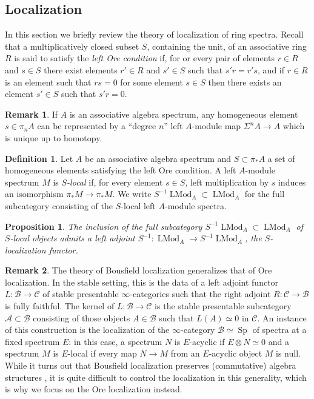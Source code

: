 \documentclass[12pt]{article}
\newtheorem{proposition}{Proposition}[subsection]
\theoremstyle{definition}
\newtheorem{definition}{Definition}[subsection]
\newtheorem{remark}{Remark}[subsection]
\newcommand{\A}{\mathcal{A}}
\newcommand{\B}{\mathcal{B}}
\newcommand{\C}{\mathcal{C}}
\renewcommand{\i}{\infty}
\DeclareMathOperator{\LMod}{LMod}
\DeclareMathOperator{\Sp}{Sp}
\begin{document}
\subsection{Localization}

In this section we briefly review the theory of localization of ring spectra.
Recall that a multiplicatively closed subset $S$, containing the unit, of an associative ring $R$ is said to
satisfy the {\em left Ore condition} if, for or every pair of elements $r\in R$ and $s\in S$ there exist elements $r'\in R$ and $s'\in S$ such that
$s'r = r's$, and if $r\in R$ is an element such that $rs = 0$ for some element $s\in S$ then there exists an
element $s'\in S$ such that $s'r=0$.

\begin{remark}
If $A$ is an associative algebra spectrum, any homogeneous element $s\in\pi_n A$ can be represented by a ``degree $n$'' left $A$-module map $\Sigma^n A\to A$ which is unique up to homotopy.
\end{remark}
\begin{definition}
Let $A$ be an associative algebra spectrum and $S\subset\pi_* A$ a set of homogeneous elements satisfying the left Ore condition.
A left $A$-module spectrum $M$ is {\em $S$-local} if, for every element $s\in S$, left multiplication by $s$ induces an isomorphism $\pi_* M\to\pi_* M$.
We write $S^{-1}\LMod_A\subset\LMod_A$ for the full subcategory consisting of the $S$-local left $A$-module spectra.
\end{definition}

\begin{proposition}{\em \cite[Remark 7.2.3.18]{HA}}
The inclusion of the full subcategory $S^{-1}\LMod_A\subset\LMod_A$ of $S$-local objects admits a left adjoint $S^{-1}:\LMod_A\to S^{-1}\LMod_A$, the $S$-localization functor.
\end{proposition}

\begin{remark}
The theory of Bousfield localization generalizes that of Ore localization.
In the stable setting, this is the data of a left adjoint functor $L:\B\to\C$ of stable presentable $\i$-categories such that the right adjoint $R:\C\to\B$ is fully faithful.
The kernel of $L:\B\to\C$ is the stable presentable subcategory $\A\subset\B$ consisting of those objects $A\in\B$ such that $L(A)\simeq 0$ in $\C$.
An instance of this construction is the localization of the $\i$-category $\B\simeq\Sp$ of spectra at a fixed spectrum $E$: in this case, a spectrum $N$ is $E$-acyclic if $E\otimes N\simeq 0$ and a spectrum $M$ is $E$-local if every map $N\to M$ from an $E$-acyclic object $M$ is null.
While it turns out that Bousfield localization preserves (commutative) algebra structures \cite[Proposition 2.2.1.9]{HA}, it is quite difficult to control the localization in this generality, which is why we focus on the Ore localization instead.
\end{remark}
\end{document}
